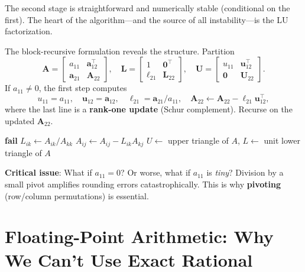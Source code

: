 The second stage is straightforward and numerically stable (conditional on the first). The heart of the algorithm---and the source of all instability---is the LU factorization.

The block-recursive formulation reveals the structure. Partition
\[
\bm{A} = \begin{bmatrix} a_{11} & \bm{a}_{12}^\top \\ \bm{a}_{21} & \bm{A}_{22} \end{bmatrix},
\quad
\bm{L} = \begin{bmatrix} 1 & \bm{0}^\top \\ \bm{\ell}_{21} & \bm{L}_{22} \end{bmatrix},
\quad
\bm{U} = \begin{bmatrix} u_{11} & \bm{u}_{12}^\top \\ \bm{0} & \bm{U}_{22} \end{bmatrix}.
\]
If $a_{11} \neq 0$, the first step computes
\[
u_{11} = a_{11},\quad
\bm{u}_{12} = \bm{a}_{12},\quad
\bm{\ell}_{21} = \bm{a}_{21}/a_{11},\quad
\bm{A}_{22} \leftarrow \bm{A}_{22} - \bm{\ell}_{21}\bm{u}_{12}^\top,
\]
where the last line is a \textbf{rank-one update} (Schur complement). Recurse on the updated $\bm{A}_{22}$.

\begin{algorithm}
\caption{Gaussian Elimination (no pivoting)}
\label{alg:ge:basic}
\begin{algorithmic}[1]
     \State \textbf{fail} \EndIf
        \State $L_{ik} \gets A_{ik} / A_{kk}$
    \EndFor
            \State $A_{ij} \gets A_{ij} - L_{ik} A_{kj}$
        \EndFor
    \EndFor
\EndFor
\State $U \gets$ upper triangle of $A$, $L \gets$ unit lower triangle of $A$
\end{algorithmic}
\end{algorithm}

\textbf{Critical issue}: What if $a_{11} = 0$? Or worse, what if $a_{11}$ is \emph{tiny}? Division by a small pivot amplifies rounding errors catastrophically. This is why \textbf{pivoting} (row/column permutations) is essential.

\section{Floating-Point Arithmetic: Why We Can't Use Exact Rational}
\label{sec:ge:float}

